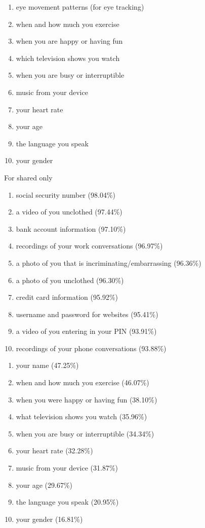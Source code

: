 \documentclass{acm_proc_article-sp}
\begin{document}
\begin{enumerate} \itemsep1pt \parskip0pt 
  \setcounter{enumi}{63}
  \item eye movement patterns (for eye tracking)
  \item when and how much you exercise
  \item when you are happy or having fun
  \item which television shows you watch
  \item when you are busy or interruptible
  \item music from your device
  \item your heart rate
  \item your age 
  \item the language you speak
  \item your gender \\[-.8cm]
\end{enumerate}

For shared only \\[-.8cm]

\begin{enumerate} \itemsep1pt \parskip0pt 
  \item social security number (98.04\%)
  \item a video of you unclothed (97.44\%)
  \item bank account information (97.10\%)
  \item recordings of your work conversations (96.97\%)
  \item a photo of you that is incriminating/embarrassing (96.36\%)
  \item a photo of you unclothed (96.30\%)
  \item credit card information (95.92\%)
  \item username and password for websites (95.41\%)
  \item a video of you entering in your PIN (93.91\%)
  \item recordings of your phone conversations (93.88\%) \\[-.8cm]
\end{enumerate}

\begin{enumerate} \itemsep1pt \parskip0pt 
  \setcounter{enumi}{63}
  \item your name (47.25\%)
  \item when and how much you exercise (46.07\%)
  \item when you were happy or having fun (38.10\%)
  \item what television shows you watch (35.96\%)
  \item when you are busy or interruptible (34.34\%)
  \item your heart rate (32.28\%)
  \item music from your device (31.87\%)
  \item your age (29.67\%)
  \item the language you speak (20.95\%)
  \item your gender (16.81\%) \\[-.8cm]
\end{enumerate}
\end{document}

